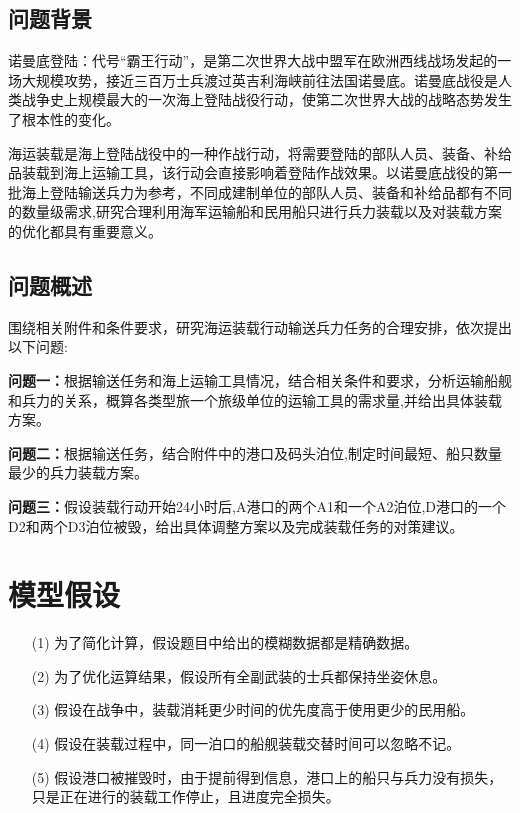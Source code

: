 \documentclass{whutmod}
\begin{document}
	\subsection{问题背景}
    诺曼底登陆：代号“霸王行动”，是第二次世界大战中盟军在欧洲西线战场发起的一场大规模攻势，接近三百万士兵渡过英吉利海峡前往法国诺曼底。诺曼底战役是人类战争史上规模最大的一次海上登陆战役行动，使第二次世界大战的战略态势发生了根本性的变化。
    
    海运装载是海上登陆战役中的一种作战行动，将需要登陆的部队人员、装备、补给品装载到海上运输工具，该行动会直接影响着登陆作战效果。以诺曼底战役的第一批海上登陆输送兵力为参考，不同成建制单位的部队人员、装备和补给品都有不同的数量级需求,研究合理利用海军运输船和民用船只进行兵力装载以及对装载方案的优化都具有重要意义。
    
    
    

	\subsection{问题概述}
    围绕相关附件和条件要求，研究海运装载行动输送兵力任务的合理安排，依次提出以下问题:
		 
	
	\textbf{问题一：}根据输送任务和海上运输工具情况，结合相关条件和要求，分析运输船舰和兵力的关系，概算各类型旅一个旅级单位的运输工具的需求量,并给出具体装载方案。
	
	\textbf{问题二：}根据输送任务，结合附件中的港口及码头泊位,制定时间最短、船只数量最少的兵力装载方案。
	
	\textbf{问题三：}假设装载行动开始24小时后,A港口的两个A1和一个A2泊位,D港口的一个D2和两个D3泊位被毁，给出具体调整方案以及完成装载任务的对策建议。
	
	
	\section{模型假设}
	\begin{itemize}                                             
		\item [(1)] 为了简化计算，假设题目中给出的模糊数据都是精确数据。
		\item [(2)] 为了优化运算结果，假设所有全副武装的士兵都保持坐姿休息。
		\item [(3)] 假设在战争中，装载消耗更少时间的优先度高于使用更少的民用船。
		\item [(4)] 假设在装载过程中，同一泊口的船舰装载交替时间可以忽略不记。
		\item [(5)] 假设港口被摧毁时，由于提前得到信息，港口上的船只与兵力没有损失，只是正在进行的装载工作停止，且进度完全损失。
	\end{itemize}
	
\end{document}
